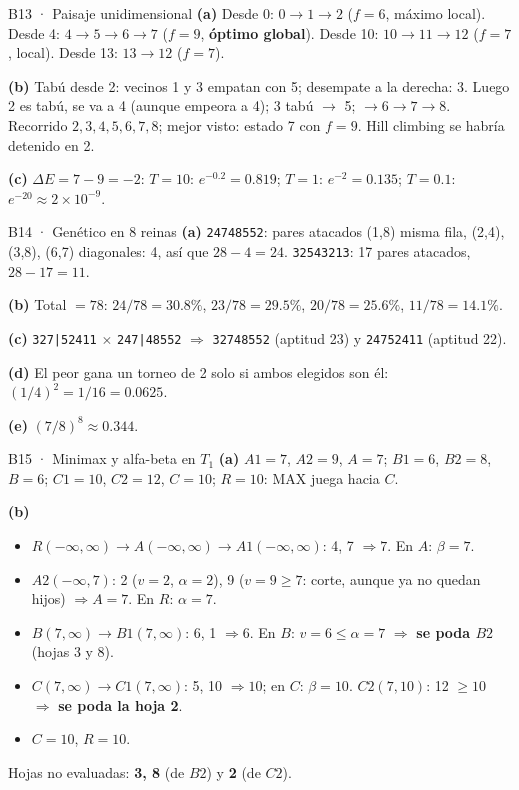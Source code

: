 \begin{solucion}{B13 · Paisaje unidimensional}
\textbf{(a)} Desde 0: $0\to1\to2$ ($f=6$, máximo local). Desde 4: $4\to5\to6\to7$ ($f=9$, \textbf{óptimo
global}). Desde 10: $10\to11\to12$ ($f=7$, local). Desde 13: $13\to12$ ($f=7$).

\textbf{(b)} Tabú desde 2: vecinos 1 y 3 empatan con 5; desempate a la derecha: 3. Luego 2 es tabú,
se va a 4 (aunque empeora a 4); 3 tabú $\to$ 5; $\to6\to7\to8$. Recorrido $2,3,4,5,6,7,8$; mejor visto:
estado 7 con $f=9$. Hill climbing se habría detenido en 2.

\textbf{(c)} $\Delta E=7-9=-2$: $T=10$: $e^{-0.2}=0.819$; $T=1$: $e^{-2}=0.135$; $T=0.1$: $e^{-20}\approx2\times10^{-9}$.
\end{solucion}

\begin{solucion}{B14 · Genético en 8 reinas}
\textbf{(a)} \texttt{24748552}: pares atacados (1,8) misma fila, (2,4), (3,8), (6,7) diagonales: 4, así que
$28-4=24$. \texttt{32543213}: 17 pares atacados, $28-17=11$.

\textbf{(b)} Total $=78$: $24/78=30.8\%$, $23/78=29.5\%$, $20/78=25.6\%$, $11/78=14.1\%$.

\textbf{(c)} \texttt{327|52411} $\times$ \texttt{247|48552} $\Rightarrow$ \texttt{32748552} (aptitud 23) y
\texttt{24752411} (aptitud 22).

\textbf{(d)} El peor gana un torneo de 2 solo si ambos elegidos son él: $(1/4)^2=1/16=0.0625$.

\textbf{(e)} $(7/8)^8\approx0.344$.
\end{solucion}

\begin{solucion}{B15 · Minimax y alfa-beta en $T_1$}
\textbf{(a)} $A1=7$, $A2=9$, $A=7$; $B1=6$, $B2=8$, $B=6$; $C1=10$, $C2=12$, $C=10$; $R=10$: MAX juega hacia $C$.

\textbf{(b)}
\begin{itemize}[nosep]
\item $R(-\infty,\infty)\to A(-\infty,\infty)\to A1(-\infty,\infty)$: 4, 7 $\Rightarrow7$. En $A$: $\beta=7$.
\item $A2(-\infty,7)$: 2 ($v=2$, $\alpha=2$), 9 ($v=9\ge7$: corte, aunque ya no quedan hijos) $\Rightarrow A=7$. En $R$: $\alpha=7$.
\item $B(7,\infty)\to B1(7,\infty)$: 6, 1 $\Rightarrow 6$. En $B$: $v=6\le\alpha=7$ $\Rightarrow$ \textbf{se poda $B2$} (hojas 3 y 8).
\item $C(7,\infty)\to C1(7,\infty)$: 5, 10 $\Rightarrow 10$; en $C$: $\beta=10$. $C2(7,10)$: 12 $\ge10$ $\Rightarrow$ \textbf{se poda la hoja 2}.
\item $C=10$, $R=10$.
\end{itemize}
Hojas no evaluadas: \textbf{3, 8} (de $B2$) y \textbf{2} (de $C2$).
\end{solucion}

